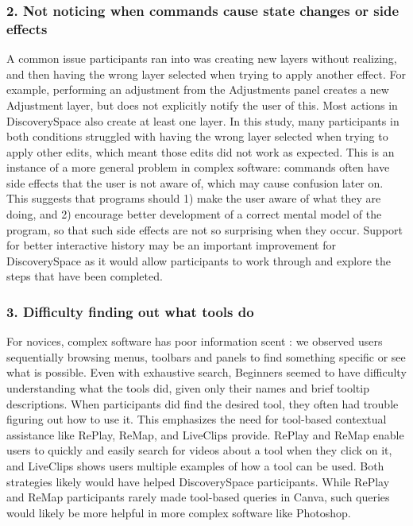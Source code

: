\subsubsection{2. Not noticing when commands cause state changes or side effects}
A common issue participants ran into was creating new layers without realizing, and then having the wrong layer selected when trying to apply another effect. For example, performing an adjustment from the Adjustments panel creates a new Adjustment layer, but does not explicitly notify the user of this. Most actions in Discovery\-Space also create at least one layer. In this study, many participants in both conditions struggled with having the wrong layer selected when trying to apply other edits, which meant those edits did not work as expected. This is an instance of a more general problem in complex software: commands often have side effects that the user is not aware of, which may cause confusion later on. This suggests that programs should 1) make the user aware of what they are doing, and 2) encourage better development of a correct mental model of the program, so that such side effects are not so surprising when they occur. Support for better interactive history may be an important improvement for Discovery\-Space as it would allow participants to work through and explore the steps that have been completed.

\subsubsection{3. Difficulty finding out what tools do}
For novices, complex software has poor information scent \cite{Pirolli2003}: we observed users sequentially browsing menus, toolbars and panels to find something specific or see what is possible. Even with exhaustive search, Beginners seemed to have difficulty understanding what the tools did, given only their names and brief tooltip descriptions. When participants did find the desired tool, they often had trouble figuring out how to use it. This emphasizes the need for tool-based contextual assistance like RePlay, ReMap, and LiveClips provide. RePlay and ReMap enable users to quickly and easily search for videos about a tool when they click on it, and LiveClips shows users multiple examples of how a tool can be used. Both strategies likely would have helped Discovery\-Space participants. While RePlay and ReMap participants rarely made tool-based queries in Canva, such queries would likely be more helpful in more complex software like Photoshop.


